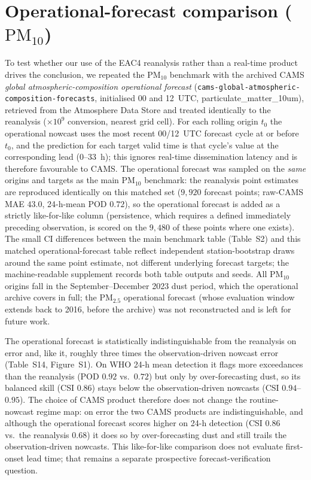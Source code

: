 \documentclass[11pt]{article}
\newcommand*{\pmtf}{\ensuremath{\mathrm{PM_{2.5}}}}
\newcommand*{\pmten}{\ensuremath{\mathrm{PM_{10}}}}
\begin{document}
\section{Operational-forecast comparison (\pmten{})}
To test whether our use of the EAC4 reanalysis rather than a real-time product drives the conclusion, we repeated the \pmten{} benchmark with the archived CAMS \emph{global atmospheric-composition operational forecast} (\texttt{cams-global-atmospheric-composition-forecasts}, initialised 00 and 12~UTC, particulate\_matter\_10um), retrieved from the Atmosphere Data Store and treated identically to the reanalysis ($\times10^{9}$ conversion, nearest grid cell). For each rolling origin $t_0$ the operational nowcast uses the most recent 00/12~UTC forecast cycle at or before $t_0$, and the prediction for each target valid time is that cycle's value at the corresponding lead (0--33~h); this ignores real-time dissemination latency and is therefore favourable to CAMS. The operational forecast was sampled on the \emph{same} origins and targets as the main \pmten{} benchmark: the reanalysis point estimates are reproduced identically on this matched set ($9{,}920$ forecast points; raw-CAMS MAE $43.0$, 24-h-mean POD $0.72$), so the operational forecast is added as a strictly like-for-like column (persistence, which requires a defined immediately preceding observation, is scored on the $9{,}480$ of these points where one exists). The small CI differences between the main benchmark table (Table~S2) and this matched operational-forecast table reflect independent station-bootstrap draws around the same point estimate, not different underlying forecast targets; the machine-readable supplement records both table outputs and seeds. All \pmten{} origins fall in the September--December 2023 dust period, which the operational archive covers in full; the \pmtf{} operational forecast (whose evaluation window extends back to 2016, before the archive) was not reconstructed and is left for future work.

The operational forecast is statistically indistinguishable from the reanalysis on error and, like it, roughly three times the observation-driven nowcast error (Table~S14, Figure~S1). On WHO 24-h mean detection it flags more exceedances than the reanalysis (POD $0.92$ vs.\ $0.72$) but only by over-forecasting dust, so its balanced skill (CSI $0.86$) stays below the observation-driven nowcasts (CSI $0.94$--$0.95$). The choice of CAMS product therefore does not change the routine-nowcast regime map: on error the two CAMS products are indistinguishable, and although the operational forecast scores higher on 24-h detection (CSI $0.86$ vs.\ the reanalysis $0.68$) it does so by over-forecasting dust and still trails the observation-driven nowcasts. This like-for-like comparison does not evaluate first-onset lead time; that remains a separate prospective forecast-verification question.
\end{document}
